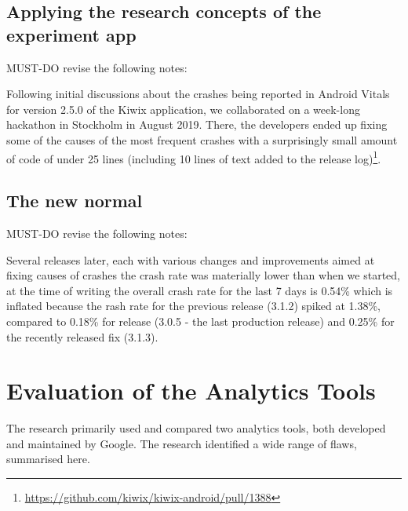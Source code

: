 \subsection{Applying the research concepts of the experiment app}
MUST-DO revise the following notes:

Following initial discussions about the crashes being reported in Android Vitals for version 2.5.0 of the Kiwix application, we collaborated on a week-long hackathon in Stockholm in August 2019. There, the developers ended up fixing some of the causes of the most frequent crashes with a surprisingly small amount of code of under 25 lines (including 10 lines of text added to the release log)\footnote{\url{https://github.com/kiwix/kiwix-android/pull/1388}}.


\subsection{The new normal}
MUST-DO revise the following notes:


Several releases later, each with various changes and improvements aimed at fixing causes of crashes the crash rate was materially lower than when we started, at the time of writing the overall crash rate for the last 7 days is 0.54\% which is inflated because the rash rate for the previous release (3.1.2) spiked at 1.38\%, compared to 0.18\% for release (3.0.5 -  the last production release) and 0.25\% for the recently released fix (3.1.3).

\section{Evaluation of the Analytics Tools}
The research primarily used and compared two analytics tools, both developed and maintained by Google. The research identified a wide range of flaws, summarised here.

